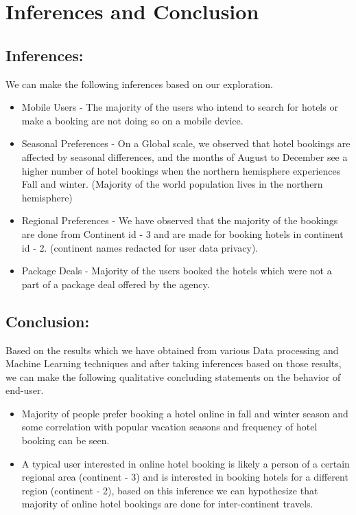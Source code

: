 \documentclass[conference]{IEEEtran}
\begin{document}
\section{\textbf{Inferences and Conclusion}}
\subsection{Inferences:}
We can make the following inferences based on our exploration.
\begin{itemize}
  \item Mobile Users - The majority of the users who intend to search for hotels or make a booking are not doing so on a mobile device.
  \item Seasonal Preferences - On a Global scale, we observed that hotel bookings are affected by seasonal differences, and the months of August to December see a higher number of hotel bookings when the northern hemisphere experiences Fall and winter. (Majority of the world population lives in the northern hemisphere)
  \item Regional Preferences - We have observed that the majority of the bookings are done from Continent id - 3 and are made for booking hotels in continent id - 2. (continent names redacted for user data privacy).
  \item Package Deals - Majority of the users booked the hotels which were not a part of a package deal offered by the agency.
  \end{itemize}
  \subsection{Conclusion:}
  Based on the results which we have obtained from various Data processing and Machine Learning techniques and after taking inferences based on those results, we can make the following qualitative concluding statements on the behavior of end-user.
  \begin{itemize}
  \item Majority of people prefer booking a hotel online in fall and winter season and some correlation with popular vacation seasons and frequency of hotel booking can be seen.
\item A typical user interested in online hotel booking is likely a person of a certain regional area (continent - 3) and is interested in booking hotels for a different region (continent - 2), based on this inference we can hypothesize that majority of online hotel bookings are done for inter-continent travels.
  \end{itemize}
  
\end{document}
